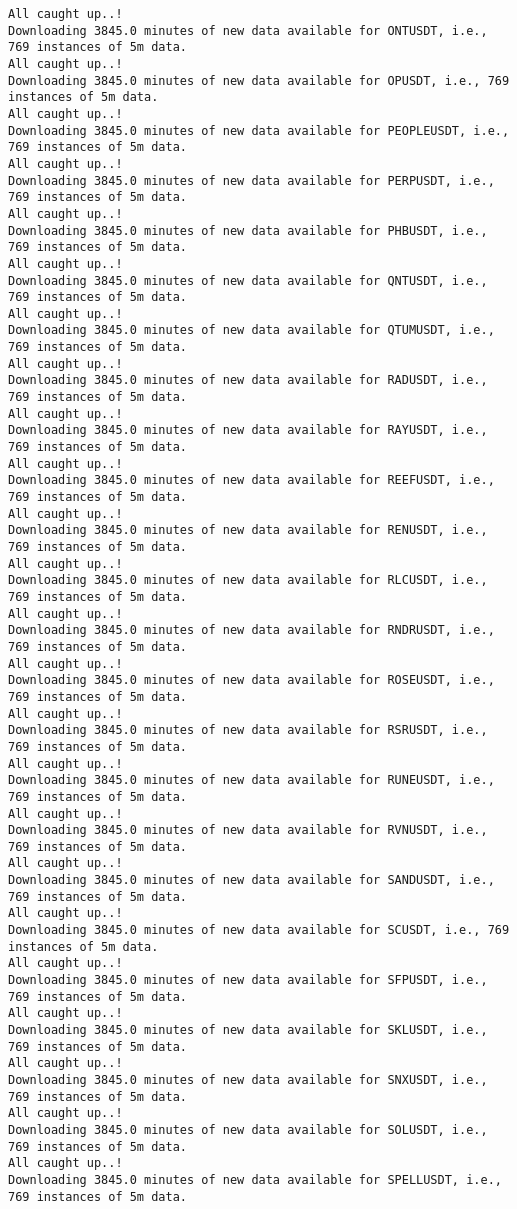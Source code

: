 \documentclass[
  letterpaper,
  DIV=11,
  numbers=noendperiod]{scrartcl}
\begin{document}
\begin{verbatim}
All caught up..!
Downloading 3845.0 minutes of new data available for ONTUSDT, i.e., 769 instances of 5m data.
All caught up..!
Downloading 3845.0 minutes of new data available for OPUSDT, i.e., 769 instances of 5m data.
All caught up..!
Downloading 3845.0 minutes of new data available for PEOPLEUSDT, i.e., 769 instances of 5m data.
All caught up..!
Downloading 3845.0 minutes of new data available for PERPUSDT, i.e., 769 instances of 5m data.
All caught up..!
Downloading 3845.0 minutes of new data available for PHBUSDT, i.e., 769 instances of 5m data.
All caught up..!
Downloading 3845.0 minutes of new data available for QNTUSDT, i.e., 769 instances of 5m data.
All caught up..!
Downloading 3845.0 minutes of new data available for QTUMUSDT, i.e., 769 instances of 5m data.
All caught up..!
Downloading 3845.0 minutes of new data available for RADUSDT, i.e., 769 instances of 5m data.
All caught up..!
Downloading 3845.0 minutes of new data available for RAYUSDT, i.e., 769 instances of 5m data.
All caught up..!
Downloading 3845.0 minutes of new data available for REEFUSDT, i.e., 769 instances of 5m data.
All caught up..!
Downloading 3845.0 minutes of new data available for RENUSDT, i.e., 769 instances of 5m data.
All caught up..!
Downloading 3845.0 minutes of new data available for RLCUSDT, i.e., 769 instances of 5m data.
All caught up..!
Downloading 3845.0 minutes of new data available for RNDRUSDT, i.e., 769 instances of 5m data.
All caught up..!
Downloading 3845.0 minutes of new data available for ROSEUSDT, i.e., 769 instances of 5m data.
All caught up..!
Downloading 3845.0 minutes of new data available for RSRUSDT, i.e., 769 instances of 5m data.
All caught up..!
Downloading 3845.0 minutes of new data available for RUNEUSDT, i.e., 769 instances of 5m data.
All caught up..!
Downloading 3845.0 minutes of new data available for RVNUSDT, i.e., 769 instances of 5m data.
All caught up..!
Downloading 3845.0 minutes of new data available for SANDUSDT, i.e., 769 instances of 5m data.
All caught up..!
Downloading 3845.0 minutes of new data available for SCUSDT, i.e., 769 instances of 5m data.
All caught up..!
Downloading 3845.0 minutes of new data available for SFPUSDT, i.e., 769 instances of 5m data.
All caught up..!
Downloading 3845.0 minutes of new data available for SKLUSDT, i.e., 769 instances of 5m data.
All caught up..!
Downloading 3845.0 minutes of new data available for SNXUSDT, i.e., 769 instances of 5m data.
All caught up..!
Downloading 3845.0 minutes of new data available for SOLUSDT, i.e., 769 instances of 5m data.
All caught up..!
Downloading 3845.0 minutes of new data available for SPELLUSDT, i.e., 769 instances of 5m data.

\end{verbatim}
\end{document}
